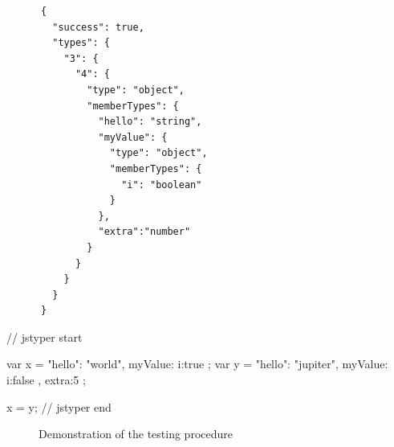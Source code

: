 \documentclass[12pt,a4paper,twoside,openright]{report}
\theoremstyle{definition}
\theoremstyle{dotless}
\begin{document}
\newsavebox{\testbox}
\begin{lrbox}{\testbox}
  \begin{minipage}[c]{75mm}
  	\begin{verbatim}
  	  {
   		"success": true,
   		"types": {
     	  "3": {
      		"4": {
       		  "type": "object",
       		  "memberTypes": {
         		"hello": "string",
         		"myValue": {
          		  "type": "object",
          		  "memberTypes": {
            		"i": "boolean"
          		  }
         		},
         		"extra":"number"
       		  }
      		}
     	  }
   		}
  	  }
	\end{verbatim}
  \end{minipage}
\end{lrbox}

\begin{lrbox}{}
  \begin{minipage}[c][111mm]{75mm}
  	\begin{jscript}
	  // jstyper start

	  var x = {
  		"hello": "world",
  		myValue: {
    	  i:true
  		}
	  };
	  var y = {
  		"hello": "jupiter",
  		myValue: {
    	  i:false  
  		},
  		extra:5
	  };

	  x = y;
	  // jstyper end


  	\end{jscript}
  \end{minipage}
\end{lrbox}
\begin{figure}
  \centering

  \caption[Demonstration of the testing procedure]{Demonstration of the testing procedure}
  \label{fig:jasmine}
\end{figure}
\end{document}
